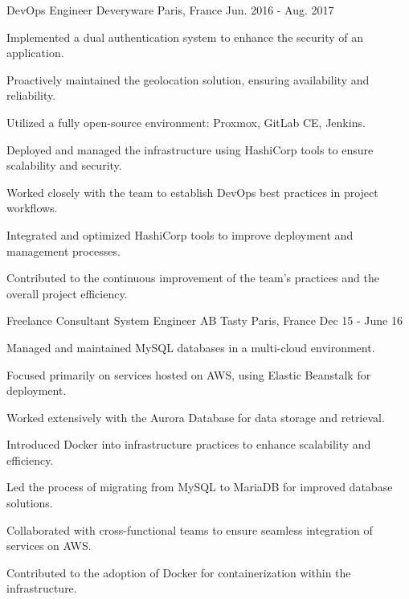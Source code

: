 \begin{cventries}
\cventry
{DevOps Engineer} %
{Deveryware} %
{Paris, France} %
{Jun. 2016 - Aug. 2017} %
{
  \begin{cvitems} %
    \item {Implemented a dual authentication system to enhance the security of an application.}
    \item {Proactively maintained the geolocation solution, ensuring availability and reliability.}
    \item {Utilized a fully open-source environment: Proxmox, GitLab CE, Jenkins.}
    \item {Deployed and managed the infrastructure using HashiCorp tools to ensure scalability and security.}
    \item {Worked closely with the team to establish DevOps best practices in project workflows.}
    \item {Integrated and optimized HashiCorp tools to improve deployment and management processes.}
    \item {Contributed to the continuous improvement of the team's practices and the overall project efficiency.}
  \end{cvitems}
}

\cventry
{Freelance Consultant System Engineer } %
{AB Tasty} %
{Paris, France} %
{Dec 15 - June 16} %
{
  \begin{cvitems} %
    \item {Managed and maintained MySQL databases in a multi-cloud environment.}
    \item {Focused primarily on services hosted on AWS, using Elastic Beanstalk for deployment.}
    \item {Worked extensively with the Aurora Database for data storage and retrieval.}
    \item {Introduced Docker into infrastructure practices to enhance scalability and efficiency.}
    \item {Led the process of migrating from MySQL to MariaDB for improved database solutions.}
    \item {Collaborated with cross-functional teams to ensure seamless integration of services on AWS.}
    \item {Contributed to the adoption of Docker for containerization within the infrastructure.}
  \end{cvitems}
}


\end{cventries}
